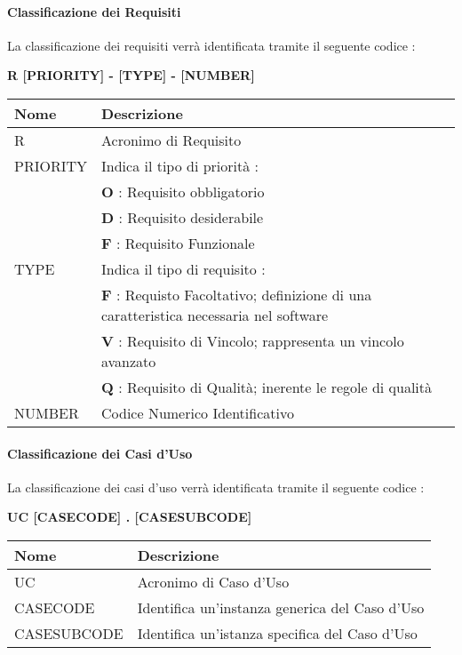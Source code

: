 		\newpage	
		\paragraph{Classificazione dei Requisiti} \hfill \break
			La classificazione dei requisiti verrà identificata tramite il seguente codice : 
			\begin{center}
				\textbf{R [PRIORITY] - [TYPE] - [NUMBER]}
			\end{center}

			\renewcommand{\arraystretch}{1.8} %
			\begin{tabular}{ |m{7em}|m{30em}| }
				\hline
				\textbf{Nome} & \textbf{Descrizione} \\
				\hline
				 R & Acronimo di Requisito \\
				\hline
				PRIORITY 	& 	Indica il tipo di priorità : \\
				 			&	\textbf{O} : Requisito obbligatorio \\
				 			&	\textbf{D} : Requisito desiderabile \\
				 			&	\textbf{F} : Requisito Funzionale \\
				 \hline
					 	 
				TYPE 		& 	Indica il tipo di requisito : \\
							& 	\textbf{F} : Requisto Facoltativo; definizione di una 	caratteristica necessaria nel software \\
							&	\textbf{V} : Requisito di Vincolo; rappresenta un vincolo avanzato \\
							&	\textbf{Q} : Requisito di Qualità; inerente le regole di qualità \\
				\hline
				 NUMBER & Codice Numerico Identificativo \\
				 \hline
			\end{tabular}
		
		\paragraph{Classificazione dei Casi d'Uso} \hfill \break
			La classificazione dei casi d'uso verrà identificata tramite il seguente codice : 
			\begin{center}
				\textbf{UC [CASECODE] . [CASESUBCODE]}
			\end{center}
		
		\begin{tabular}{ |m{10em}|m{27em}| }
			\hline
			\textbf{Nome} 	& \textbf{Descrizione} \\
			\hline
			UC 				& Acronimo di Caso d'Uso \\
			\hline
			CASECODE		& Identifica un'instanza generica del Caso d'Uso  \\
			\hline
			CASESUBCODE 	& Identifica un'istanza specifica del Caso d'Uso \\
			\hline
		\end{tabular}
		
